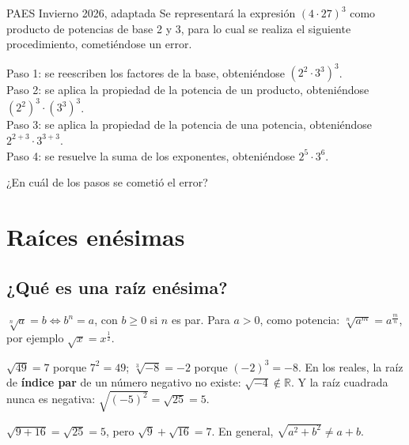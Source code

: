 \begin{elejemplo}{PAES Invierno 2026, adaptada}
Se representará la expresión $(4\cdot 27)^3$ como producto de potencias de base 2 y 3, para lo cual se realiza el siguiente procedimiento, cometiéndose un error.

Paso 1: se reescriben los factores de la base, obteniéndose $(2^2\cdot 3^3)^3$.\\
Paso 2: se aplica la propiedad de la potencia de un producto, obteniéndose $(2^2)^3\cdot(3^3)^3$.\\
Paso 3: se aplica la propiedad de la potencia de una potencia, obteniéndose $2^{2+3}\cdot 3^{3+3}$.\\
Paso 4: se resuelve la suma de los exponentes, obteniéndose $2^5\cdot 3^6$.

¿En cuál de los pasos se cometió el error?
\end{elejemplo}

\section{Raíces enésimas}

\subsection{¿Qué es una raíz enésima?}
\begin{clave}[Definición] $\sqrt[n]{a} = b \iff b^n = a$, con $b\geq 0$ si $n$ es par. Para $a>0$, como potencia: $\sqrt[n]{a^m} = a^{\frac{m}{n}}$, por ejemplo $\sqrt{x} = x^{\frac{1}{2}}$.\end{clave}
$\sqrt{49} = 7$ porque $7^2 = 49$; $\sqrt[3]{-8} = -2$ porque $(-2)^3 = -8$. En los reales, la raíz de \textbf{índice par} de un número negativo no existe: $\sqrt{-4} \notin \mathbb{R}$. Y la raíz cuadrada nunca es negativa: $\sqrt{(-5)^2} = \sqrt{25} = 5$.
\begin{ojo} $\sqrt{9 + 16} = \sqrt{25} = 5$, pero $\sqrt{9} + \sqrt{16} = 7$. En general, $\sqrt{a^2 + b^2} \neq a + b$.\end{ojo}

